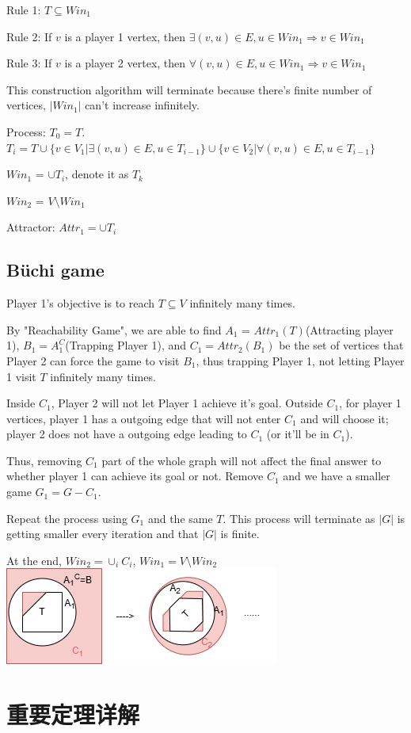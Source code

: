 \documentclass[12pt,a4paper]{ctexrep}
\begin{document}
Rule 1: $T \subseteq Win_1$

Rule 2: If $v$ is a player 1 vertex, then $\exists (v,u) \in E, u \in Win_1 \Rightarrow v \in Win_1$

Rule 3: If $v$ is a player 2 vertex, then $\forall (v,u) \in E, u \in Win_1 \Rightarrow v \in Win_1$

This construction algorithm will terminate because there's finite number of vertices, $|Win_1|$ can't increase infinitely.

Process: $T_0 = T$. $T_i = T \cup \{v \in V_1|\exists (v,u)\in E, u \in T_{i-1}\} \cup \{v \in V_2| \forall (v,u)\in E, u \in T_{i-1}\}$

$Win_1$ = $\cup T_i$, denote it as $T_k$

$Win_2$ = $V \setminus Win_1$

Attractor: $Attr_1 = \cup T_i$
\subsection{B\"uchi game}
Player 1's objective is to reach $T \subseteq V$ infinitely many times. 

By "Reachability Game", we are able to find $A_1$ = $Attr_1(T)$(Attracting player 1), $B_1 = A_1^C$(Trapping Player 1), and $C_1 = Attr_2(B_1)$ be the set of vertices that Player 2 can force the game to visit $B_1$, thus trapping Player 1, not letting Player 1 visit $T$ infinitely many times.

Inside $C_1$, Player 2 will not let Player 1 achieve it's goal. Outside $C_1$, for player 1 vertices, player 1 has a outgoing edge that will not enter $C_1$ and will choose it; player 2 does not have a outgoing edge leading to $C_1$ (or it'll be in $C_1$).

Thus, removing $C_1$ part of the whole graph will not affect the final answer to whether player 1 can achieve its goal or not. Remove $C_1$ and we have a smaller game $G_1 = G - C_1$.

Repeat the process using $G_1$ and the same $T$. This process will terminate as $|G|$ is getting smaller every iteration and that $|G|$ is finite.

At the end, $Win_2 = \cup_i C_i$, $Win_1 = V \setminus Win_2$\\

\centering
\includegraphics[scale=0.5]{buchi_game.png}
\section{重要定理详解}
\ifdebug
\end{document}
